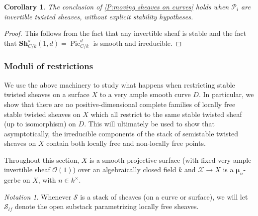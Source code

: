 \documentclass[11pt]{amsart}
\newcommand{\ms}[1]{\mathscr #1}
\DeclareMathOperator{\Pic}{Pic}
\newcommand{\m}{\boldsymbol{\mu}}
\renewcommand{\[}{[\!\hspace{0.03em}[}
\renewcommand{\]}{]\!\hspace{0.03em}]}
\renewcommand{\(}{(\!\hspace{0.03em}(}
\renewcommand{\)}{)\!\hspace{0.03em})}
\newcommand{\Sh}{\mathbf{Sh}}
\newtheorem{cor}[lem]{Corollary}
\theoremstyle{definition}
\theoremstyle{remark}
\newtheorem{notation}[lem]{Notation}
\begin{document}
\begin{cor}\label{C:connecting picard mamas} The conclusion of \ref{P:moving 
sheaves on curves} holds when $\ms P_{i}$ are invertible twisted 
sheaves, without explicit stability hypotheses.
\end{cor}
\begin{proof} This follows from the fact that any 
invertible sheaf is stable and the fact that 
$\Sh^{s}_{C/k}(1,d)=\Pic_{C/k}^{d}$ is smooth and irreducible.
\end{proof}


\subsubsection{Moduli of restrictions}
We use the above machinery to study what happens when restricting 
stable twisted sheaves on a surface $X$ to a very ample smooth curve 
$D$.  In 
particular, we show that there are no positive-dimensional complete families of locally 
free stable twisted sheaves on $X$ which all restrict to the same stable 
twisted sheaf (up to isomorphism) on $D$.  This will ultimately be used to show that 
asymptotically, the irreducible components of the stack of 
semistable twisted sheaves on $X$ contain both locally free and 
non-locally free points.

Throughout this section, $X$ is a smooth projective surface (with 
fixed very ample invertible sheaf ${\ms O}(1)$) over an 
algebraically closed field $k$ and $\ms X\to X$ is a $\m_{n}$-gerbe 
on $X$, with $n\in k^{\times}$.



\begin{notation} Whenever $\ms S$ is a stack of sheaves (on a curve or surface), we will let $\ms S_{lf}$ denote the open substack parametrizing locally free sheaves.
\end{notation}
\end{document}
